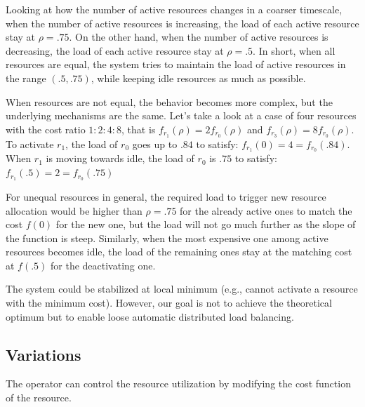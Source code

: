 Looking at how the number of active resources changes in a coarser
timescale,
when the number of active resources is increasing, the load of each
active resource stay at $\rho = .75$.
On the other hand, when the number of active resources is decreasing,
the load of each active resource stay at $\rho = .5$.
In short, when all resources are equal, the system tries to maintain
the load of active resources in the range $(.5, .75)$, while keeping
idle resources as much as possible.

When resources are not equal, the behavior becomes more complex, but
the underlying mechanisms are the same.
Let's take a look at a case of four resources with the cost ratio $1:2:4:8$,
that is $f_{r_{1}}(\rho) = 2 f_{r_{0}}(\rho)$ and $f_{r_{3}}(\rho) = 8 f_{r_{0}}(\rho)$.
To activate $r_{1}$, the load of $r_{0}$ goes up to $.84$ to satisfy:
$f_{r_{1}}(0) = 4 = f_{r_{0}}(.84)$.
When $r_{1}$ is moving towards idle, the load of $r_{0}$ is $.75$ to
satisfy: $f_{r_{1}}(.5) = 2 = f_{r_{0}}(.75)$

For unequal resources in general, the required load to trigger new
resource allocation would be higher than $\rho = .75$ for the already
active ones to match the cost $f(0)$ for the new one, but the load
will not go much further as the slope of the function is steep.
Similarly, when the most expensive one among active resources becomes
idle, the load of the remaining ones stay at the matching cost at
$f(.5)$ for the deactivating one.

The system could be stabilized at local minimum (e.g., cannot activate
a resource with the minimum cost).
However, our goal is not to achieve the theoretical optimum but to
enable loose automatic distributed load balancing.

\subsection{Variations}

The operator can control the resource utilization by modifying the cost
function of the resource.

